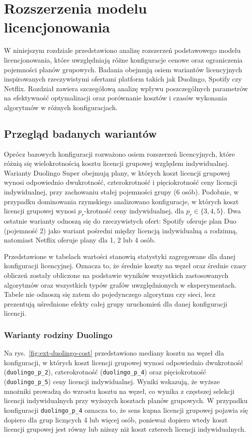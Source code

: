 \chapter{Rozszerzenia modelu licencjonowania}\label{chap:extensions}

W niniejszym rozdziale przedstawiono analizę rozszerzeń podstawowego modelu licencjonowania, które uwzględniają różne konfiguracje cenowe oraz ograniczenia pojemności planów grupowych. Badania obejmują osiem wariantów licencyjnych inspirowanych rzeczywistymi ofertami platform takich jak Duolingo, Spotify czy Netflix. Rozdział zawiera szczegółową analizę wpływu poszczególnych parametrów na efektywność optymalizacji oraz porównanie kosztów i czasów wykonania algorytmów w różnych konfiguracjach.

\section{Przegląd badanych wariantów}
Oprócz bazowych konfiguracji rozważono osiem rozszerzeń licencyjnych, które różnią się wielokrotnością kosztu licencji grupowej względem indywidualnej. Warianty Duolingo Super obejmują plany, w których koszt licencji grupowej wynosi odpowiednio dwukrotność, czterokrotność i pięciokrotność ceny licencji indywidualnej, przy zachowaniu stałej pojemności grupy (6 osób). Podobnie, w przypadku dominowania rzymskiego analizowano konfiguracje, w których koszt licencji grupowej wynosi $p_r$-krotność ceny indywidualnej, dla $p_r \in \{3, 4, 5\}$. Dwa ostatnie warianty odnoszą się do rzeczywistych ofert: Spotify oferuje plan Duo (pojemność 2) jako wariant pośredni między licencją indywidualną a rodzinną, natomiast Netflix oferuje plany dla 1, 2 lub 4 osób.

Przedstawione w tabelach wartości stanowią statystyki zagregowane dla danej konfiguracji licencyjnej. Oznacza to, że średnie koszty na węzeł oraz średnie czasy obliczeń zostały obliczone na podstawie wyników wszystkich zastosowanych algorytmów oraz wszystkich typów grafów uwzględnionych w eksperymentach. Tabele nie odnoszą się zatem do pojedynczego algorytmu czy sieci, lecz prezentują uśrednione efekty całej grupy uruchomień dla danej konfiguracji licencji.


\subsection{Warianty rodziny Duolingo}
Na rys.~\ref{fig:ext-duolingo-cost} przedstawiono mediany kosztu na węzeł dla konfiguracji, w których koszt licencji grupowej wynosi odpowiednio dwukrotność (\texttt{duolingo\_p\_2}), czterokrotność (\texttt{duolingo\_p\_4}) oraz pięciokrotność (\texttt{duolingo\_p\_5}) ceny licencji indywidualnej. Wyniki wskazują, że wyższe mnożniki prowadzą do wzrostu kosztu na węzeł, co wynika z częstszej selekcji licencji indywidualnych przy wyższych kosztach planów grupowych. W przypadku konfiguracji \texttt{duolingo\_p\_4} oznacza to, że sens kupna licencji grupowej pojawia się dopiero dla grup liczących 4 lub więcej osób, ponieważ dopiero wtedy koszt licencji grupowej jest równy lub niższy niż koszt czterech licencji indywidualnych.

